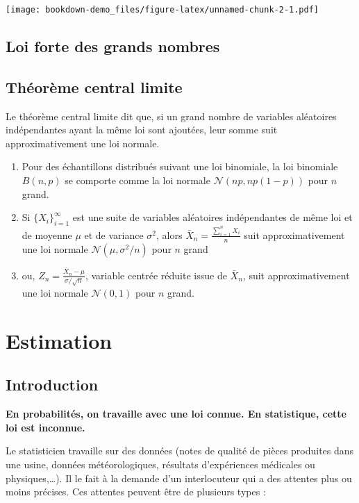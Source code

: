 \documentclass[]{book}
\theoremstyle{definition}
\theoremstyle{definition}
\theoremstyle{remark}
\begin{document}
\texttt{[image: bookdown-demo\_files/figure-latex/unnamed-chunk-2-1.pdf]}

\section{Loi forte des grands
nombres}\label{loi-forte-des-grands-nombres}

\section{Théorème central limite}\label{theoreme-central-limite}

Le théorème central limite dit que, si un grand nombre de variables
aléatoires indépendantes ayant la même loi sont ajoutées, leur somme
suit approximativement une loi normale.

\begin{enumerate}
\def\labelenumi{\arabic{enumi}.}
\item
  Pour des échantillons distribués suivant une loi binomiale, la loi
  binomiale \(B(n,p)\) se comporte comme la loi normale
  \(\mathcal N(np,np(1-p))\) pour \(n\) grand.
\item
  Si \(\{X_i\}_{i=1}^{\infty}\) est une suite de variables aléatoires
  indépendantes de même loi et de moyenne \(\mu\) et de variance
  \(\sigma^2\), alors
  \(\bar X_n=\frac{\displaystyle \sum_{i=1}^nX_i}{n}\) suit
  approximativement une loi normale \(\mathcal N(\mu,\sigma^2/n)\) pour
  \(n\) grand
\item
  ou, \(Z_n=\frac{\bar X_n-\mu}{\sigma/\sqrt{n}}\), variable centrée
  réduite issue de \(\bar X_n\), suit approximativement une loi normale
  \(\mathcal N(0,1)\) pour \(n\) grand.
\end{enumerate}

\chapter{Estimation}\label{estimation}

\section{Introduction}\label{introduction}

\textbf{En probabilités, on travaille avec une loi connue. En
statistique, cette loi est inconnue.}

Le statisticien travaille sur des données (notes de qualité de pièces
produites dans une usine, données météorologiques, résultats
d'expériences médicales ou physiques,\ldots{}). Il le fait à la demande
d'un interlocuteur qui a des attentes plus ou moins précises. Ces
attentes peuvent être de plusieurs types :
\end{document}
